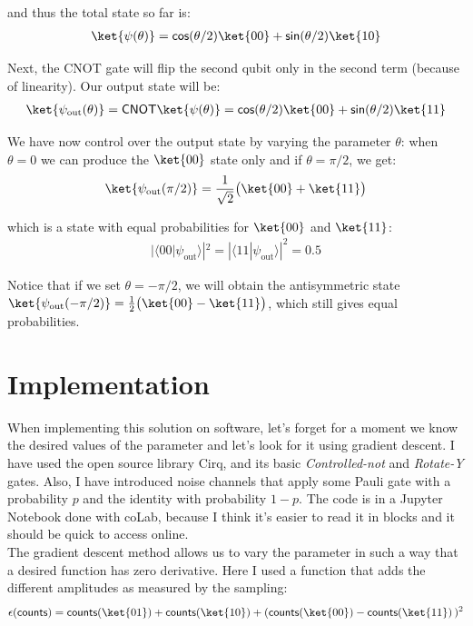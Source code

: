 \documentclass[11pt]{article}
\begin{document}
and thus the total state so far is:
%
\begin{align}
\ket{\psi(\theta)} = \textsf{cos}(\theta/2) \ket{00} + \textsf{sin}(\theta/2) \ket{10}
\end{align}

Next, the \textsf{CNOT} gate will flip the second qubit only in the second term (because of linearity). Our output state will be:
%
\begin{align}
\ket{\psi_{\text{out}}(\theta)}=\textsf{CNOT}\ket{\psi(\theta)} = \textsf{cos}(\theta/2) \ket{00} + \textsf{sin}(\theta/2) \ket{11}
\end{align}

We have now control over the output state by varying the parameter $\theta$: when $\theta=0$ we can produce the $\ket{00}$ state only and if $\theta = \pi/2$, we get:
%
\begin{align}
\ket{\psi_{\text{out}}(\pi/2)}= \frac{1}{\sqrt{2}} \big( \ket{00} +  \ket{11} \big)
\end{align}

which is a state with equal probabilities for $\ket{00}$ and $\ket{11}$:
%
\begin{align}
|\langle 00 | \psi_{\text{out}} \rangle |^2 = |\langle 11 | \psi_{\text{out}} \rangle |^2 = 0.5
\end{align}

 Notice that if we set $\theta = -\pi/2$, we will obtain the antisymmetric state $\ket{\psi_{\text{out}}(-\pi/2)}= \frac{1}{2} \big( \ket{00} -  \ket{11} \big)$, which still gives equal probabilities.

\section{Implementation}

When implementing this solution on software, let's forget for a moment we know the desired values of the parameter and let's look for it using gradient descent. I have used the open source library \textsf{Cirq}, and its basic \emph{Controlled-not} and \emph{Rotate-Y} gates. Also, I have introduced noise channels that apply some Pauli gate with a probability $p$ and the identity with probability $1-p$. The code is in a \textsf{Jupyter Notebook} done with coLab, because I think it's easier to read it in blocks and it should be quick to access online.
\\

The gradient descent method allows us to vary the parameter in such a way that a desired function has zero derivative. Here I used a function that adds the different amplitudes as measured by the sampling:
%
\begin{align}
\epsilon(\textsf{counts}) = \textsf{counts}(\ket{01}) + \textsf{counts}(\ket{10}) +(\textsf{counts}(\ket{00})-\textsf{counts}(\ket{11})\,)^2
\end{align}
\end{document}
